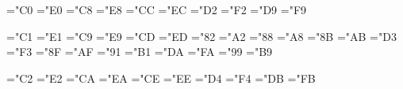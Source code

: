 \def\make@ec@accent#1#2{%
  \def#1##1{\@ifundefined{ec@#2@\detokenize{##1}}
    {\csname ec@#2\endcsname{##1}}{\csname ec@#2@##1\endcsname}}}
\make@ec@accent\`{grave}
\make@ec@accent\'{acute}
\make@ec@accent\^{circumflex}
\make@ec@accent\~{tilde}
\make@ec@accent\"{dieresis}
\make@ec@accent\H{doubleacute}
\make@ec@accent\r{ring}
\make@ec@accent\v{caron}
\make@ec@accent\u{breve}
\make@ec@accent\={macron}
\make@ec@accent\.{dotabove}
\make@ec@accent\c{cedilla}
\make@ec@accent\k{ogonek}


\def\ec@grave#1{{\accent"0 #1}}
\chardef\ec@grave@A="C0
\chardef\ec@grave@a="E0
\chardef\ec@grave@E="C8
\chardef\ec@grave@e="E8
\chardef\ec@grave@I="CC
\chardef\ec@grave@i="EC
\chardef\ec@grave@O="D2
\chardef\ec@grave@o="F2
\chardef\ec@grave@U="D9
\chardef\ec@grave@u="F9

\def\ec@acute#1{{\accent"1 #1}}
\chardef\ec@acute@A="C1
\chardef\ec@acute@a="E1
\chardef\ec@acute@E="C9
\chardef\ec@acute@e="E9
\chardef\ec@acute@I="CD
\chardef\ec@acute@i="ED
\chardef\ec@acute@C="82
\chardef\ec@acute@c="A2
\chardef\ec@acute@L="88
\chardef\ec@acute@l="A8
\chardef\ec@acute@N="8B
\chardef\ec@acute@n="AB
\chardef\ec@acute@O="D3
\chardef\ec@acute@o="F3
\chardef\ec@acute@R="8F
\chardef\ec@acute@r="AF
\chardef\ec@acute@S="91
\chardef\ec@acute@s="B1
\chardef\ec@acute@U="DA
\chardef\ec@acute@u="FA
\chardef\ec@acute@Z="99
\chardef\ec@acute@z="B9

\def\ec@circumflex#1{{\accent"2 #1}}
\chardef\ec@circumflex@A="C2
\chardef\ec@circumflex@a="E2
\chardef\ec@circumflex@E="CA
\chardef\ec@circumflex@e="EA
\chardef\ec@circumflex@I="CE
\chardef\ec@circumflex@i="EE
\chardef\ec@circumflex@O="D4
\chardef\ec@circumflex@o="F4
\chardef\ec@circumflex@U="DB
\chardef\ec@circumflex@u="FB

